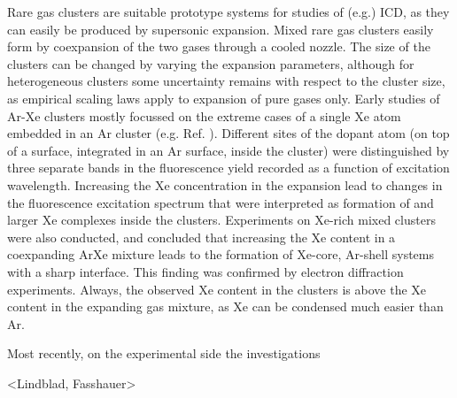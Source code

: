 \documentclass[journal=jpccck,manuscript=article]{achemso}
\begin{document}
Rare gas clusters are suitable prototype systems for studies of (e.g.) ICD, as they can easily be produced by supersonic expansion. Mixed rare gas clusters easily form by coexpansion of the two gases through a cooled nozzle. The size of the clusters can be changed by varying the expansion parameters, although for heterogeneous clusters some uncertainty remains with respect to the cluster size, as empirical scaling laws \cite{hagena1981} apply to expansion of pure gases only. Early studies of Ar-Xe clusters mostly focussed on the extreme cases of a single Xe atom embedded in an Ar cluster (e.g. Ref. ). Different sites of the dopant atom (on top of a surface, integrated in an Ar surface, inside the cluster) were distinguished by three separate bands in the fluorescence yield recorded as a function of excitation wavelength.\cite{lengenprl} Increasing the Xe concentration in the expansion lead to changes in the fluorescence excitation spectrum that were interpreted as formation of  and larger Xe complexes inside the clusters.\cite{lengen} Experiments on Xe-rich mixed clusters were also conducted, and concluded that increasing the Xe content in a coexpanding ArXe mixture leads to the formation of Xe-core, Ar-shell systems with a sharp interface.\cite{tchaplyguine} This finding was confirmed by electron diffraction experiments.\cite{Danylchenko} Always, the observed Xe content in the clusters is above the Xe content in the expanding gas mixture, as Xe can be condensed much easier than Ar.

Most recently, on the experimental side the investigations 

<Lindblad, Fasshauer>



\end{document}

